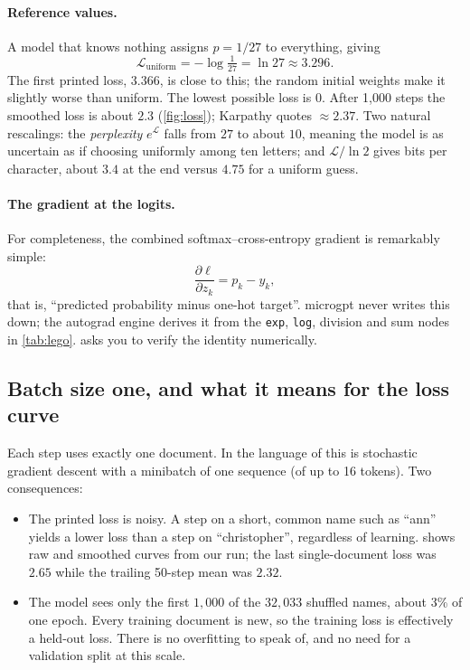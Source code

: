 \documentclass[11pt,letterpaper]{article}
\theoremstyle{remark}
\newcommand{\code}[1]{\lstinline[basicstyle=\ttfamily\small]|#1|}
\newcommand{\dd}[2]{\frac{\partial #1}{\partial #2}}
\begin{document}
\paragraph{Reference values.} A model that knows nothing assigns $p = 1/27$ to everything, giving
\begin{equation}
\mathcal L_{\text{uniform}} = -\log\tfrac{1}{27} = \ln 27 \approx 3.296 .
\end{equation}
The first printed loss, $3.366$, is close to this; the random initial weights make it slightly worse than uniform. The lowest possible loss is $0$. After 1{,}000 steps the smoothed loss is about $2.3$ (\cref{fig:loss}); Karpathy quotes $\approx 2.37$. Two natural rescalings: the \emph{perplexity} $e^{\mathcal L}$ falls from $27$ to about $10$, meaning the model is as uncertain as if choosing uniformly among ten letters; and $\mathcal L/\ln 2$ gives bits per character, about $3.4$ at the end versus $4.75$ for a uniform guess.

\paragraph{The gradient at the logits.} For completeness, the combined softmax--cross-entropy gradient is remarkably simple:
\begin{equation}
\dd{\ell}{z_k} = p_k - y_k,
\end{equation}
that is, ``predicted probability minus one-hot target''. microgpt never writes this down; the autograd engine derives it from the \code{exp}, \code{log}, division and sum nodes in \cref{tab:lego}.  asks you to verify the identity numerically.

\subsection{Batch size one, and what it means for the loss curve}

Each step uses exactly one document. In the language of \textcite{robbins1951stochastic} this is stochastic gradient descent with a minibatch of one sequence (of up to 16 tokens). Two consequences:

\begin{itemize}[leftmargin=2em]
  \item The printed loss is noisy. A step on a short, common name such as ``ann'' yields a lower loss than a step on ``christopher'', regardless of learning.  shows raw and smoothed curves from our run; the last single-document loss was $2.65$ while the trailing 50-step mean was $2.32$.
  \item The model sees only the first $1{,}000$ of the $32{,}033$ shuffled names, about 3\% of one epoch. Every training document is new, so the training loss is effectively a held-out loss. There is no overfitting to speak of, and no need for a validation split at this scale.
\end{itemize}
\end{document}
